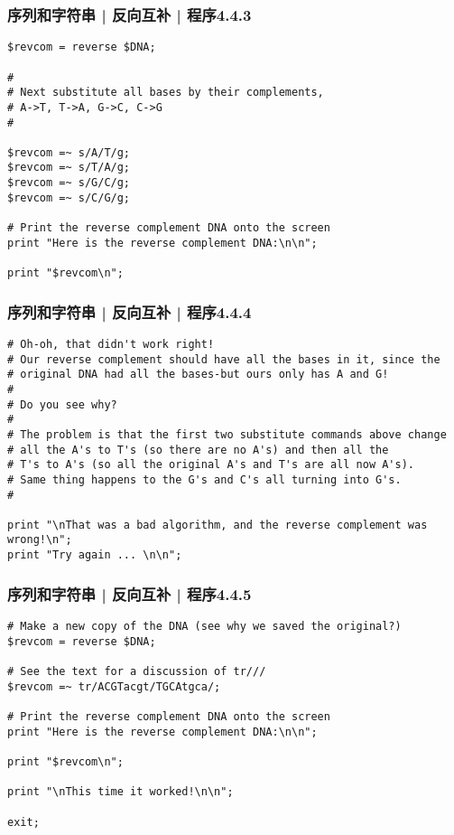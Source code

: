 \begin{frame}[fragile]
  \frametitle{序列和字符串 | 反向互补 | 程序4.4.3}
\begin{lstlisting}[firstnumber=27,basicstyle=\footnotesize\tt]
$revcom = reverse $DNA;

#
# Next substitute all bases by their complements,
# A->T, T->A, G->C, C->G
#

$revcom =~ s/A/T/g;
$revcom =~ s/T/A/g;
$revcom =~ s/G/C/g;
$revcom =~ s/C/G/g;

# Print the reverse complement DNA onto the screen
print "Here is the reverse complement DNA:\n\n";

print "$revcom\n";
\end{lstlisting}
\end{frame}

\begin{frame}[fragile]
  \frametitle{序列和字符串 | 反向互补 | 程序4.4.4}
\begin{lstlisting}[firstnumber=45,basicstyle=\scriptsize\tt]
# Oh-oh, that didn't work right!
# Our reverse complement should have all the bases in it, since the
# original DNA had all the bases-but ours only has A and G!
#
# Do you see why?
#
# The problem is that the first two substitute commands above change
# all the A's to T's (so there are no A's) and then all the
# T's to A's (so all the original A's and T's are all now A's).
# Same thing happens to the G's and C's all turning into G's.
#

print "\nThat was a bad algorithm, and the reverse complement was wrong!\n";
print "Try again ... \n\n";
\end{lstlisting}
\end{frame}

\begin{frame}[fragile]
  \frametitle{序列和字符串 | 反向互补 | 程序4.4.5}
\begin{lstlisting}[firstnumber=60,basicstyle=\small\tt]
# Make a new copy of the DNA (see why we saved the original?)
$revcom = reverse $DNA;

# See the text for a discussion of tr///
$revcom =~ tr/ACGTacgt/TGCAtgca/;

# Print the reverse complement DNA onto the screen
print "Here is the reverse complement DNA:\n\n";

print "$revcom\n";

print "\nThis time it worked!\n\n";

exit;
\end{lstlisting}
\end{frame}

